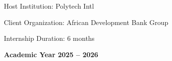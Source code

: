 \begin{titlepage}
\vspace{2.0cm}
{\sffamily\small\color{thesisgray} Host Institution: Polytech Intl \par}
{\sffamily\small\color{thesisgray} Client Organization: African Development Bank Group \par}
{\sffamily\small\color{thesisgray} Internship Duration: 6 months \par}

\vfill
{\sffamily\bfseries\color{thesisgray} Academic Year 2025 -- 2026 \par}

\end{titlepage}

\newpage
\thispagestyle{empty}
\mbox{}
